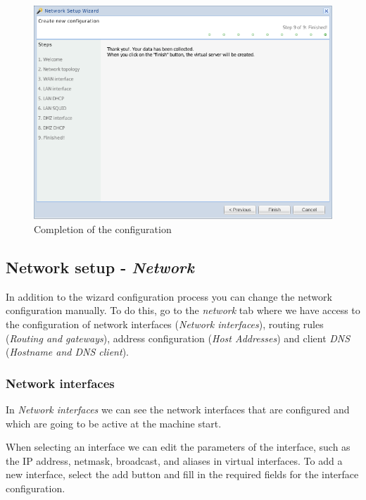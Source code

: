 \begin{figure}[H]
    \begin{center}
    \includegraphics[scale=0.38]{screenshots/etfw/etfw_wizard_09.png}
    \caption{Completion of the configuration}
    \label{fig:etfw_wizard_passo9}
    \end{center}
\end{figure}

\subsection{Network setup - \textit{Network}}
In addition to the wizard configuration process you can change the network configuration manually.
To do this, go to the \textit{network} tab where we have access to the configuration of network interfaces (\textit{Network interfaces}), routing rules (\textit{Routing and gateways}), address configuration (\textit{Host Addresses}) and client \textit{DNS} (\textit{Hostname and DNS client}).

\subsubsection{Network interfaces}
In \textit{Network interfaces} we can see the network interfaces that are configured and which are going to be active at the machine start.

When selecting an interface we can edit the parameters of the interface, such as the IP address, netmask, broadcast, and aliases in virtual interfaces.
To add a new interface, select the add button and fill in the required fields for the interface configuration.

